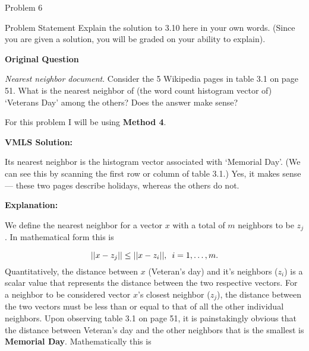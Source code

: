 \begin{problem}{Problem 6}
    \begin{statement}{Problem Statement}
        Explain the solution to 3.10 here in your own words. (Since you are given a solution, you will be graded on your ability to explain). \vspace*{1em}

        \textbf{Original Question} \vspace*{1em}

        \textit{Nearest neighbor document}. Consider the 5 Wikipedia pages in table 3.1 on page 51. What is the nearest neighbor of (the word count histogram vector of) `Veterans Day' among the others?
        Does the answer make sense?
    \end{statement}

    \begin{Highlight}[Solution]
        For this problem I will be using \textbf{Method 4}. \vspace*{1em}

        \textbf{VMLS Solution:} \vspace*{1em}

        Its nearest neighbor is the histogram vector associated with ‘Memorial Day’. (We can see this by scanning the first row or column of table 3.1.) Yes, it makes sense — these two pages describe 
        holidays, whereas the others do not. \vspace*{1em}

        \textbf{Explanation:} \vspace*{1em}

        We define the nearest neighbor for a vector $x$ with a total of $m$ neighbors to be $z_{j}$. In mathematical form this is

        \setcounter{equation}{0}
        \begin{equation}
            ||x - z_{j}|| \leq ||x - z_{i}||, \hspace*{5pt} i = 1,\dots,m.
        \end{equation}
        Quantitatively, the distance between $x$ (Veteran's day) and it's neighbors ($z_{i}$) is a scalar value that represents the distance between the two respective vectors. For a neighbor to be considered
        vector $x$'s closest neighbor ($z_{j}$), the distance between the two vectors must be less than or equal to that of all the other individual neighbors. Upon observing table 3.1 on page 51, it is painstakingly
        obvious that the distance between Veteran's day and the other neighbors that is the smallest is \textbf{Memorial Day}. Mathematically this is


\end{Highlight}
\end{problem}
